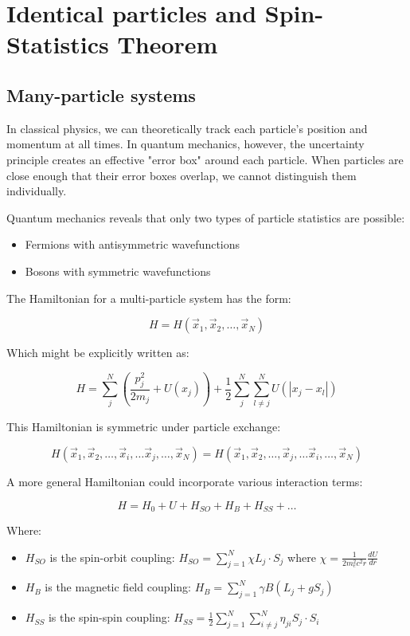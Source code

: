 \chapter{Identical particles and Spin-Statistics Theorem}
\section{Many-particle systems}
In classical physics, we can theoretically track each particle's position and momentum at all times. In quantum mechanics, however, the uncertainty principle creates an effective "error box" around each particle. When particles are close enough that their error boxes overlap, we cannot distinguish them individually.

Quantum mechanics reveals that only two types of particle statistics are possible:
\begin{itemize}
  \item Fermions with antisymmetric wavefunctions
  \item Bosons with symmetric wavefunctions
\end{itemize}

The Hamiltonian for a multi-particle system has the form:

\begin{equation}
H=H(\vec{x}_1,\vec{x}_2,\ldots,\vec{x}_N)
\end{equation}

Which might be explicitly written as:

\begin{equation}
H=\sum_{j}^{N}(\frac{p_j^2}{2m_j}+U(x_j))+\frac{1}{2}\sum_{j}^{N}\sum_{l\neq j}^{N}U(|x_j-x_l|)
\end{equation}

This Hamiltonian is symmetric under particle exchange:

\begin{equation}
H(\vec{x}_1,\vec{x}_2,\ldots,\vec{x}_i,\ldots\vec{x}_j,\ldots,\vec{x}_N)=H(\vec{x}_1,\vec{x}_2,\ldots,\vec{x}_j,\ldots\vec{x}_i,\ldots,\vec{x}_N)
\end{equation}


A more general Hamiltonian could incorporate various interaction terms:

\begin{equation}
H=H_0+U+H_{SO}+H_B+H_{SS}+\ldots
\end{equation}

Where:
\begin{itemize}
  \item $H_{SO}$ is the spin-orbit coupling: $H_{SO}=\sum_{j=1}^{N}\chi L_j\cdot S_j$ where $\chi=\frac{1}{2m_e^2c^2r}\frac{dU}{dr}$
  \item $H_B$ is the magnetic field coupling: $H_B=\sum_{j=1}^{N}\gamma B(L_j+gS_j)$
  \item $H_{SS}$ is the spin-spin coupling: $H_{SS}=\frac{1}{2}\sum_{j=1}^{N}\sum_{i\neq j}^{N}\eta_{ji}S_j\cdot S_i$
\end{itemize}

